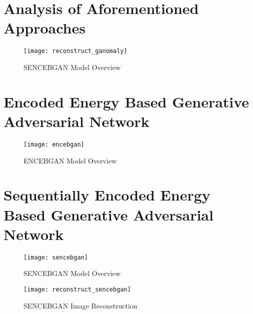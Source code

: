 \section{Analysis of Aforementioned Approaches}
\label{sec:analysis_before}

\begin{figure}[h!]
	\centering
	\texttt{[image: reconstruct\_ganomaly]}
	\caption{SENCEBGAN Model Overview }
	\label{fig:sencebgan_model}
\end{figure}

\section{Encoded Energy Based Generative Adversarial Network}
\label{sec:encebgan}

\begin{figure}[h!]
	\centering
	\texttt{[image: encebgan]}
	\caption{ENCEBGAN Model Overview }
	\label{fig:encebgan_model}
\end{figure}

\section{Sequentially Encoded Energy Based Generative Adversarial Network}
\label{sec:sencebgan}

\begin{figure}[h!]
	\centering
	\texttt{[image: sencebgan]}
	\caption{SENCEBGAN Model Overview }
	\label{fig:sencebgan_model}
\end{figure}

\begin{figure}[h!]
	\centering
	\texttt{[image: reconstruct\_sencebgan]}
	\caption{SENCEBGAN Image Reconstruction  }
	\label{fig:sencebgan_model}
\end{figure}



\endgroup